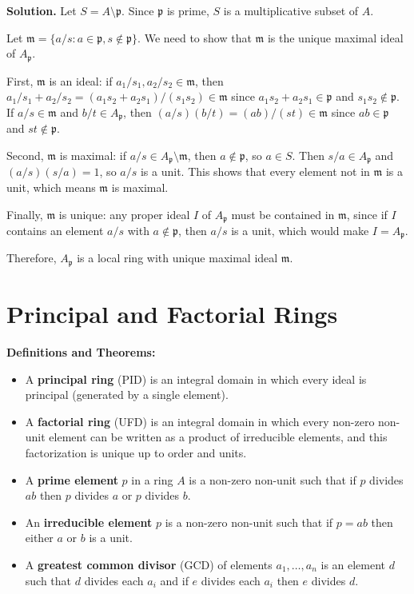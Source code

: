 \noindent\textbf{Solution.}
Let $S = A \setminus \mathfrak{p}$. Since $\mathfrak{p}$ is prime, $S$ is a multiplicative subset of $A$.

Let $\mathfrak{m} = \{a/s : a \in \mathfrak{p}, s \notin \mathfrak{p}\}$. We need to show that $\mathfrak{m}$ is the unique maximal ideal of $A_{\mathfrak{p}}$.

First, $\mathfrak{m}$ is an ideal: if $a_1/s_1, a_2/s_2 \in \mathfrak{m}$, then $a_1/s_1 + a_2/s_2 = (a_1s_2 + a_2s_1)/(s_1s_2) \in \mathfrak{m}$ since $a_1s_2 + a_2s_1 \in \mathfrak{p}$ and $s_1s_2 \notin \mathfrak{p}$. If $a/s \in \mathfrak{m}$ and $b/t \in A_{\mathfrak{p}}$, then $(a/s)(b/t) = (ab)/(st) \in \mathfrak{m}$ since $ab \in \mathfrak{p}$ and $st \notin \mathfrak{p}$.

Second, $\mathfrak{m}$ is maximal: if $a/s \in A_{\mathfrak{p}} \setminus \mathfrak{m}$, then $a \notin \mathfrak{p}$, so $a \in S$. Then $s/a \in A_{\mathfrak{p}}$ and $(a/s)(s/a) = 1$, so $a/s$ is a unit. This shows that every element not in $\mathfrak{m}$ is a unit, which means $\mathfrak{m}$ is maximal.

Finally, $\mathfrak{m}$ is unique: any proper ideal $I$ of $A_{\mathfrak{p}}$ must be contained in $\mathfrak{m}$, since if $I$ contains an element $a/s$ with $a \notin \mathfrak{p}$, then $a/s$ is a unit, which would make $I = A_{\mathfrak{p}}$.

Therefore, $A_{\mathfrak{p}}$ is a local ring with unique maximal ideal $\mathfrak{m}$.

\section{Principal and Factorial Rings}

\noindent\textbf{Definitions and Theorems:}
\begin{itemize}
\item A \textbf{principal ring} (PID) is an integral domain in which every ideal is principal (generated by a single element).
\item A \textbf{factorial ring} (UFD) is an integral domain in which every non-zero non-unit element can be written as a product of irreducible elements, and this factorization is unique up to order and units.
\item A \textbf{prime element} $p$ in a ring $A$ is a non-zero non-unit such that if $p$ divides $ab$ then $p$ divides $a$ or $p$ divides $b$.
\item An \textbf{irreducible element} $p$ is a non-zero non-unit such that if $p = ab$ then either $a$ or $b$ is a unit.
\item A \textbf{greatest common divisor} (GCD) of elements $a_1, \ldots, a_n$ is an element $d$ such that $d$ divides each $a_i$ and if $e$ divides each $a_i$ then $e$ divides $d$.
\end{itemize}


